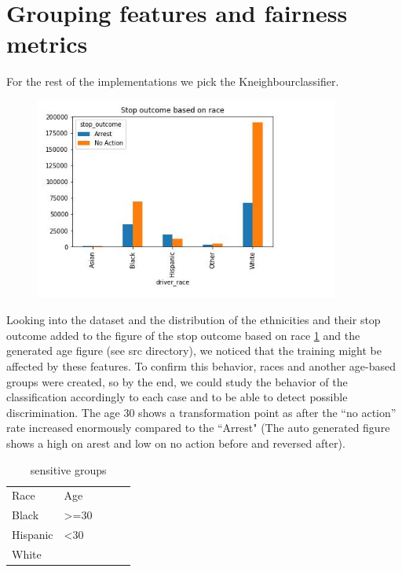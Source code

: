 \documentclass[doctype=studienarbeit,lang=english,BCOR=15mm,biblatex]{ldvbook}
\begin{document}
\section{Grouping features and fairness metrics}
For the rest of the implementations we pick the Kneighbourclassifier.
\begin{figure}[h]
    \centering
    \includegraphics[width=10cm]{stopoutbased on race.JPG} 
    \label{fig:stop}%
\end{figure}
Looking into the dataset and the distribution of the ethnicities and their stop outcome added to the figure of the stop outcome based on race \ref{fig:stop} and the generated age figure (see src directory), we noticed that the training might be affected by these features. To confirm this behavior, races and another age-based groups were created, so by the end, we could study the behavior of the classification accordingly to  each case and to be able to detect possible discrimination. The age 30 shows a transformation point as after the “no action” rate increased enormously compared to the “Arrest" (The auto generated figure shows a high on arest and low on no action before and reversed after).
\begin{table}[h]
\centering
\begin{tabular}{lllll}
 Race& Age&  &  &  \\
 Black&  >=30&  &  &  \\
 Hispanic&  <30&  &  &  \\
 White&  &  &  & 
\end{tabular}
\caption{sensitive groups}
\end{table}
\end{document}
